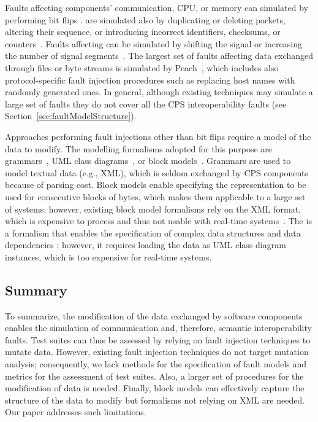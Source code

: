 Faults affecting components' communication,
CPU, or memory can simulated by performing bit flips
\cite{tsai1999stress,barton1990fault,han1995doctor,dawson1996testing}.
 are simulated also by duplicating or deleting packets, altering their sequence, or introducing incorrect identifiers, checksums, or counters~\cite{di2015evolutionary,di2015generating}.
Faults affecting  can be simulated by shifting the signal or increasing the number of signal segments~\cite{Matinnejad19}.
The largest set of faults affecting data exchanged through files or byte streams is simulated by Peach~\cite{PeachFuzzer}, which includes also protocol-specific fault injection procedures such as replacing host names with randomly generated ones.
In general, although existing techniques may simulate a large set of faults they do not cover all the CPS interoperability faults (see Section~\ref{sec:faultModelStructure}).

Approaches performing fault injections other than bit flips require a model of the data to modify.
The modelling formalisms adopted for this purpose are grammars~\cite{ghosh1998testing,Godefroid:GrammarBasedFuzzying:2008,godefroid2012sage,bounimova2013billions}, UML class diagrams~\cite{di2015evolutionary,di2015generating}, or block models~\cite{pham2016model,PeachFuzzer}.
Grammars are used to model textual data (e.g., XML), which is seldom exchanged by CPS components because of parsing cost.
Block models enable specifying the representation to be used for consecutive blocks of bytes, which makes them applicable to a large set of systems; however, existing block model formalisms rely on the XML format, which is expensive to process and thus not usable with real-time systems~\cite{pham2016model,PeachFuzzer}.
The  is a formalism that
enables the specification of complex data structures and
data dependencies
\cite{di2015evolutionary,di2015generating}; however, it requires loading the data as UML class diagram instances, which is too expensive for real-time systems.

\subsection{Summary}

To summarize, the modification of the data exchanged by software components enables the simulation of communication and, therefore, semantic interoperability faults.
Test suites can thus be assessed by relying on fault injection techniques to mutate data.
However, existing fault injection techniques do not target mutation analysis; consequently, we lack methods for the specification of fault models and metrics for the assessment of test suites.
Also, a larger set of procedures for the modification of data is needed.
Finally, block models can effectively capture the structure of the data to modify but formalisms not relying on XML are needed. Our paper addresses such limitations.


